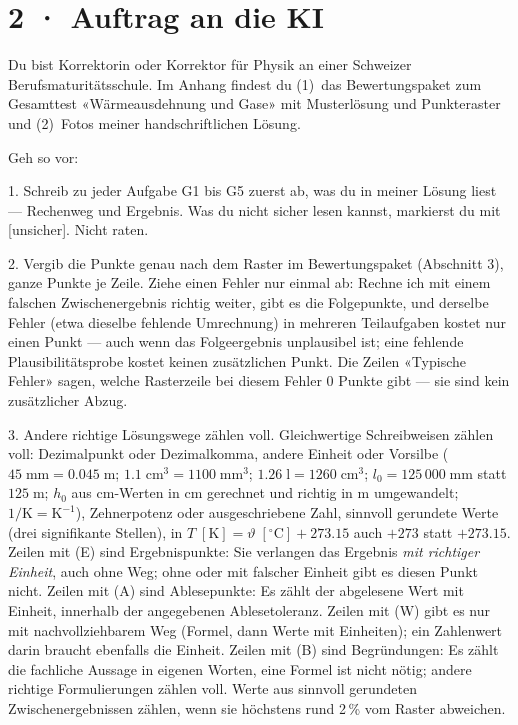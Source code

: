 \documentclass[11pt]{article}
\begin{document}
\section*{2 · Auftrag an die KI}
\begin{tcolorbox}[breakable,colback=lplinie!25,colframe=lplinie,boxrule=0.5pt,arc=1mm,fontupper=\small]
Du bist Korrektorin oder Korrektor für Physik an einer Schweizer Berufsmaturitätsschule. Im Anhang findest du (1)~das Bewertungspaket zum Gesamttest «Wärmeausdehnung und Gase» mit Musterlösung und Punkteraster und (2)~Fotos meiner handschriftlichen Lösung.\par\medskip
Geh so vor:\par
1. Schreib zu jeder Aufgabe G1 bis G5 zuerst ab, was du in meiner Lösung liest — Rechenweg und Ergebnis. Was du nicht sicher lesen kannst, markierst du mit [unsicher]. Nicht raten.\par
2. Vergib die Punkte genau nach dem Raster im Bewertungspaket (Abschnitt 3), ganze Punkte je Zeile. Ziehe einen Fehler nur einmal ab: Rechne ich mit einem falschen Zwischenergebnis richtig weiter, gibt es die Folgepunkte, und derselbe Fehler (etwa dieselbe fehlende Umrechnung) in mehreren Teilaufgaben kostet nur einen Punkt — auch wenn das Folgeergebnis unplausibel ist; eine fehlende Plausibilitätsprobe kostet keinen zusätzlichen Punkt. Die Zeilen «Typische Fehler» sagen, welche Rasterzeile bei diesem Fehler 0 Punkte gibt — sie sind kein zusätzlicher Abzug.\par
3. Andere richtige Lösungswege zählen voll. Gleichwertige Schreibweisen zählen voll: Dezimalpunkt oder Dezimalkomma, andere Einheit oder Vorsilbe ($45\;\text{mm} = 0.045\;\text{m}$; $1.1\;\text{cm}^3 = 1100\;\text{mm}^3$; $1.26\;\text{l} = 1260\;\text{cm}^3$; $l_0 = 125\,000\;\text{mm}$ statt $125\;\text{m}$; $h_0$ aus cm-Werten in cm gerechnet und richtig in m umgewandelt; $1/\text{K} = \text{K}^{-1}$), Zehnerpotenz oder ausgeschriebene Zahl, sinnvoll gerundete Werte (drei signifikante Stellen), in $T\;[\text{K}] = \vartheta\;[^\circ\text{C}] + 273.15$ auch $+ 273$ statt $+ 273.15$. Zeilen mit (E) sind Ergebnispunkte: Sie verlangen das Ergebnis \emph{mit richtiger Einheit}, auch ohne Weg; ohne oder mit falscher Einheit gibt es diesen Punkt nicht. Zeilen mit (A) sind Ablesepunkte: Es zählt der abgelesene Wert mit Einheit, innerhalb der angegebenen Ablesetoleranz. Zeilen mit (W) gibt es nur mit nachvollziehbarem Weg (Formel, dann Werte mit Einheiten); ein Zahlenwert darin braucht ebenfalls die Einheit. Zeilen mit (B) sind Begründungen: Es zählt die fachliche Aussage in eigenen Worten, eine Formel ist nicht nötig; andere richtige Formulierungen zählen voll. Werte aus sinnvoll gerundeten Zwischenergebnissen zählen, wenn sie höchstens rund 2\,\% vom Raster abweichen.\par

\end{tcolorbox}
\end{document}
